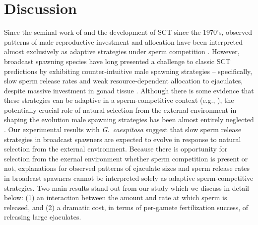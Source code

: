 \documentclass{article}
\begin{document}
\section{Discussion}

Since the seminal work of \citet{Bateman1948} and the development of SCT since the 1970's, observed patterns of male reproductive investment and allocation have been interpreted almost exclusively as adaptive strategies under sperm competition \citep{Parker1972,Parker1982,Wedell2002,Parker2017}. However, broadcast spawning species have long presented a challenge to classic SCT predictions by exhibiting counter-intuitive male spawning strategies -- specifically, slow sperm release rates and weak resource-dependent allocation to ejaculates, despite massive investment in gonad tissue \citep{McEuan1988, MarshallBolton2007, Styan2003, Olito2015}. Although there is some evidence that these strategies can be adaptive in a sperm-competitive context (e.g., \citealt{BodeMarshall2007,Olito2015,Olito2017,LotterhosLevitan2011}), the potentially crucial role of natural selection from the external environment in shaping the evolution male spawning strategies has been almost entirely neglected \citep{MarshallBolton2007}. Our experimental results with \textit{G.~caespitosa} suggest that slow sperm release strategies in broadcast spawners are expected to evolve in response to natural selection from the external environment. Because there is opportunity for selection from the exernal environment whether sperm competition is present or not, explanations for observed patterns of ejaculate sizes and sperm release rates in broadcast spawners cannot be interpreted solely as adaptive sperm-competitive strategies. Two main results stand out from our study which we discuss in detail below: (1) an interaction between the amount and rate at which sperm is released, and (2) a dramatic cost, in terms of per-gamete fertilization success, of releasing large ejaculates. 
\end{document}
